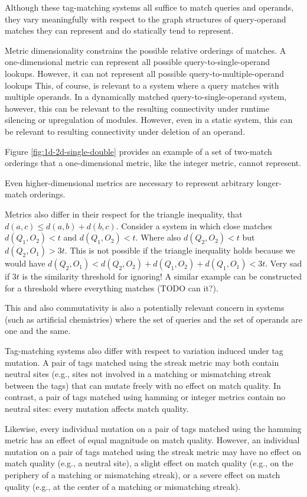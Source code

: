 Although these tag-matching systems all suffice to match queries and operands, they vary meaningfully with respect to the graph structures of query-operand matches they can represent and do statically tend to represent.

Metric dimensionality constrains the possible relative orderings of matches.
A one-dimensional metric can represent all possible query-to-single-operand lookups.
However, it can not represent all possible query-to-multiple-operand lookups
This, of course, is relevant to a system where a query matches with multiple operands.
In a dynamically matched query-to-single-operand system, however, this can be relevant to the resulting connectivity under runtime silencing or upregulation of modules.
However, even in a static system, this can be relevant to resulting connectivity under deletion of an operand.

Figure \ref{fig:1d-2d-single-double} provides an example of a set of two-match orderings that a one-dimensional metric, like the integer metric, cannot represent.

Even higher-dimensional metrics are necessary to represent arbitrary longer-match orderings.

Metrics also differ in their respect for the triangle inequality, that $d(a,c) \leq d(a,b) + d(b,c)$.
Consider a system in which close matches $d(Q_1, O_2) < t$ and $d(Q_1, O_2) < t$.
Where also $d(Q_2, O_2) < t$ but $d(Q_2, O_1) > 3t$.
This is not possible if the triangle inequality holds because we would have $d(Q_2, O_1) < d(Q_2, O_2) + d(Q_1, O_2)+ d(Q_1, O_1) < 3t$.
Very sad if $3t$ is the similarity threshold for ignoring!
A similar example can be constructed for a threshold where everything matches (TODO can it?).

This and also commutativity is also a potentially relevant concern in systems (such as artificial chemistries) where the set of queries and the set of operands are one and the same.

Tag-matching systems also differ with respect to variation induced under tag mutation.
A pair of tags matched using the streak metric may both contain neutral sites (e.g., sites not involved in a matching or mismatching streak between the tags) that can mutate freely with no effect on match quality.
In contrast, a pair of tags matched using hamming or integer metrics contain no neutral sites: every mutation affects match quality.

Likewise, every individual mutation on a pair of tags matched using the hamming metric has an effect of equal magnitude on match quality.
However, an individual mutation on a pair of tags matched using the streak metric may have no effect on match quality (e.g., a neutral site), a slight effect on match quality (e.g., on the periphery of a matching or mismatching streak), or a severe effect on match quality (e.g., at the center of a matching or mismatching streak).

